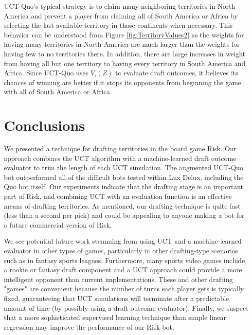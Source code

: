 \documentclass[letterpaper]{article}
\numberwithin{equation}{section}
\numberwithin{theorem}{section}
\numberwithin{lemma}{section}
\numberwithin{df}{section}
\begin{document}
UCT-Quo's typical strategy is to claim many neighboring territories in North America and prevent a player from claiming all of South America or Africa by selecting the last available territory in those continents when necessary.  This behavior can be understood from Figure \ref{fig:TerritoryValues2} as the weights for having many territories in North America are much larger than the weights for having few to no territories there.  In addition, there are large increases in weight from having all but one territory to having every territory in South America and Africa.  Since UCT-Quo uses $V_i(Z)$ to evaluate draft outcomes, it believes its chances of winning are better if it stops its opponents from beginning the game with all of South America or Africa.

\section{Conclusions}



We presented a technique for drafting territories in the board game Risk.  Our approach combines the UCT algorithm with a machine-learned draft outcome evaluator to trim the length of each UCT simulation.  The augmented UCT-Quo bot outperformed all of the difficult bots tested within Lux Delux, including the Quo bot itself.  Our experiments indicate that the drafting stage is an important part of Risk, and combining UCT with an evaluation function is an effective means of drafting territories.  As mentioned, our drafting technique is quite fast (less than a second per pick) and could be appealing to anyone making a bot for a future commercial version of Risk.

We see potential future work stemming from using UCT and a machine-learned evaluator in other types of games, particularly in other drafting-type scenarios such as in fantasy sports leagues.  Furthermore, many sports video games include a rookie or fantasy draft component and a UCT approach could provide a more intelligent opponent than current implementations.  These and other drafting "games" are convenient because the number of turns each player gets is typically fixed, guaranteeing that UCT simulations will terminate after a predictable amount of time (by possibly using a draft outcome evaluator).  Finally, we suspect that a more sophisticated supervised learning technique than simple linear regression may improve the performance of our Risk bot.  


%
%


\end{document}
